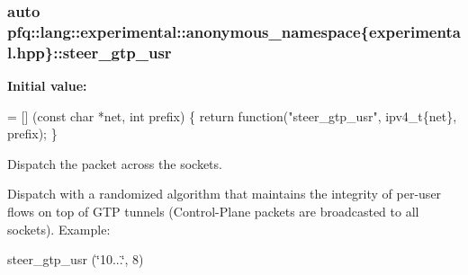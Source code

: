 \subsubsection[{\texorpdfstring{steer\+\_\+gtp\+\_\+usr}{steer_gtp_usr}}]{\setlength{\rightskip}{0pt plus 5cm}auto pfq\+::lang\+::experimental\+::anonymous\+\_\+namespace\{experimental.\+hpp\}\+::steer\+\_\+gtp\+\_\+usr}\hypertarget{namespacepfq_1_1lang_1_1experimental_1_1anonymous__namespace_02experimental_8hpp_03_a6b08a2b49251677736f1939eaadac4a6}{}\label{namespacepfq_1_1lang_1_1experimental_1_1anonymous__namespace_02experimental_8hpp_03_a6b08a2b49251677736f1939eaadac4a6}
{\bfseries Initial value\+:}
\begin{DoxyCode}
= [] (\textcolor{keyword}{const} \textcolor{keywordtype}{char} *net, \textcolor{keywordtype}{int} prefix)
        \{
            \textcolor{keywordflow}{return} \textcolor{keyword}{function}(\textcolor{stringliteral}{"steer\_gtp\_usr"}, ipv4\_t\{net\}, prefix);
        \}
\end{DoxyCode}


Dispatch the packet across the sockets. 

Dispatch with a randomized algorithm that maintains the integrity of per-\/user flows on top of G\+TP tunnels (Control-\/\+Plane packets are broadcasted to all sockets). Example\+:

steer\+\_\+gtp\+\_\+usr (\char`\"{}10...\char`\"{}, 8) 